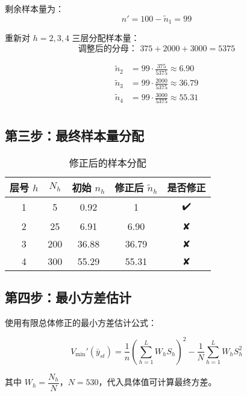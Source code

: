 \documentclass[cn,hazy,blue,12pt,normal]{elegantnote}
\begin{document}
剩余样本量为：
\[
n' = 100 - \tilde{n}_1 = 99
\]

重新对 $h=2,3,4$ 三层分配样本量：
\[
\text{调整后的分母： } 375 + 2000 + 3000 = 5375
\]

\begin{align*}
\tilde{n}_2 &= 99 \cdot \frac{375}{5375} \approx 6.90 \\
\tilde{n}_3 &= 99 \cdot \frac{2000}{5375} \approx 36.79 \\
\tilde{n}_4 &= 99 \cdot \frac{3000}{5375} \approx 55.31 \\
\end{align*}

\subsection*{第三步：最终样本量分配}

\begin{table}[H]
\centering
\caption{修正后的样本分配}
\begin{tabular}{ccccc}
\toprule
层号 $h$ & $N_h$ & 初始 $n_h$ & 修正后 $\tilde{n}_h$ & 是否修正 \\
\midrule
1 & 5   & 0.92 & 1 & ✔️ \\
2 & 25  & 6.91 & 6.90 & ✘ \\
3 & 200 & 36.88 & 36.79 & ✘ \\
4 & 300 & 55.29 & 55.31 & ✘ \\
\bottomrule
\end{tabular}
\end{table}

\subsection*{第四步：最小方差估计}

使用有限总体修正的最小方差估计公式：

\[
V_{\min}'(\bar{y}_{st}) = \frac{1}{n} \left( \sum_{h=1}^L W_h S_h \right)^2 - \frac{1}{N} \sum_{h=1}^L W_h S_h^2
\]

其中 $W_h = \dfrac{N_h}{N}$，$N = 530$，代入具体值可计算最终方差。
\end{document}
